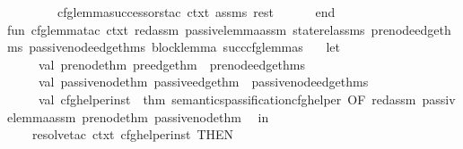 \begin{isabellebody}
\ \ \ \ \ \ \ \ cfg{\isacharunderscore}{\kern0pt}lemma{\isacharunderscore}{\kern0pt}successors{\isacharunderscore}{\kern0pt}tac\ ctxt\ assms\ rest\isanewline
\ \ \ \ \ \ end\isanewline
\isanewline
fun\ cfg{\isacharunderscore}{\kern0pt}lemma{\isacharunderscore}{\kern0pt}tac\ ctxt\ red{\isacharunderscore}{\kern0pt}assm\ passive{\isacharunderscore}{\kern0pt}lemma{\isacharunderscore}{\kern0pt}assm\ state{\isacharunderscore}{\kern0pt}rel{\isacharunderscore}{\kern0pt}assms\ pre{\isacharunderscore}{\kern0pt}node{\isacharunderscore}{\kern0pt}edge{\isacharunderscore}{\kern0pt}thms\ passive{\isacharunderscore}{\kern0pt}node{\isacharunderscore}{\kern0pt}edge{\isacharunderscore}{\kern0pt}thms\ block{\isacharunderscore}{\kern0pt}lemma\ succ{\isacharunderscore}{\kern0pt}cfg{\isacharunderscore}{\kern0pt}lemmas\ {\isacharequal}{\kern0pt}\isanewline
\ \ let\ \isanewline
\ \ \ \ \ val\ {\isacharparenleft}{\kern0pt}pre{\isacharunderscore}{\kern0pt}node{\isacharunderscore}{\kern0pt}thm{\isacharcomma}{\kern0pt}\ pre{\isacharunderscore}{\kern0pt}edge{\isacharunderscore}{\kern0pt}thm{\isacharparenright}{\kern0pt}\ {\isacharequal}{\kern0pt}\ pre{\isacharunderscore}{\kern0pt}node{\isacharunderscore}{\kern0pt}edge{\isacharunderscore}{\kern0pt}thms\isanewline
\ \ \ \ \ val\ {\isacharparenleft}{\kern0pt}passive{\isacharunderscore}{\kern0pt}node{\isacharunderscore}{\kern0pt}thm{\isacharcomma}{\kern0pt}\ passive{\isacharunderscore}{\kern0pt}edge{\isacharunderscore}{\kern0pt}thm{\isacharparenright}{\kern0pt}\ {\isacharequal}{\kern0pt}\ passive{\isacharunderscore}{\kern0pt}node{\isacharunderscore}{\kern0pt}edge{\isacharunderscore}{\kern0pt}thms\isanewline
\ \ \ \ \ val\ cfg{\isacharunderscore}{\kern0pt}helper{\isacharunderscore}{\kern0pt}inst\ {\isacharequal}{\kern0pt}\ {\isacharat}{\kern0pt}{\isacharbraceleft}{\kern0pt}thm\ semantics{\isachardot}{\kern0pt}passification{\isacharunderscore}{\kern0pt}cfg{\isacharunderscore}{\kern0pt}helper{\isacharbraceright}{\kern0pt}\ OF\ {\isacharbrackleft}{\kern0pt}red{\isacharunderscore}{\kern0pt}assm{\isacharcomma}{\kern0pt}\ passive{\isacharunderscore}{\kern0pt}lemma{\isacharunderscore}{\kern0pt}assm{\isacharcomma}{\kern0pt}\ pre{\isacharunderscore}{\kern0pt}node{\isacharunderscore}{\kern0pt}thm{\isacharcomma}{\kern0pt}\ passive{\isacharunderscore}{\kern0pt}node{\isacharunderscore}{\kern0pt}thm{\isacharbrackright}{\kern0pt}\isanewline
\ \ in\isanewline
\ \ \ \ resolve{\isacharunderscore}{\kern0pt}tac\ ctxt\ {\isacharbrackleft}{\kern0pt}cfg{\isacharunderscore}{\kern0pt}helper{\isacharunderscore}{\kern0pt}inst{\isacharbrackright}{\kern0pt}\ THEN{\isacharprime}{\kern0pt}\isanewline

\end{isabellebody}
